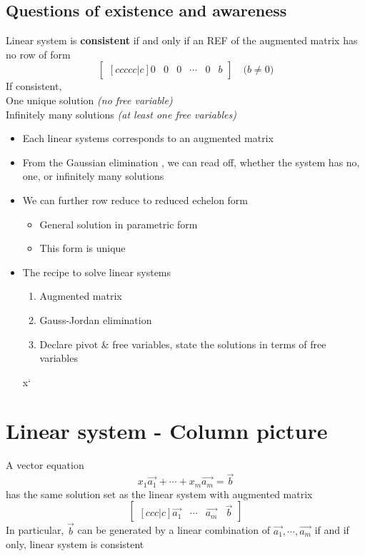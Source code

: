\documentclass{article}
\begin{document}
{\subsection{Questions of existence and awareness}

{
Linear system is \textbf{consistent} if and only if an REF of the augmented matrix has no row of form
\[
\begin{bmatrix}[ccccc|c]
    0 & 0 & 0 & \cdots & 0 & b 
\end{bmatrix}
 \quad \textit{($b \neq 0$)}
\]
If consistent, \\ One unique solution \textit{(no free variable)} \\  Infinitely many solutions \textit{(at least one free variables)}

\begin{itemize}
    \item{Each linear systems corresponds to an augmented matrix}
    \item{From the Gaussian elimination , we can read off, whether the system has no, one, or infinitely many solutions}
    \item{We can further row reduce to reduced echelon form}
    \begin{itemize}
        \item{General solution in parametric form}
        \item{This form is unique}
    \end{itemize}
    \item{The recipe to solve linear systems}
    \begin{enumerate}
        \item {Augmented matrix}
        \item {Gauss-Jordan elimination}
        \item {Declare pivot \& free variables, state the solutions in terms of free variables}
    \end{enumerate}x`
\end{itemize}
}

\section{Linear system - Column picture }

A vector equation
\[
x_1\vec{a_1} + \cdots + x_m\vec{a_m} = \vec{b}
\]
has the same solution set as the linear system with augmented matrix
\[
\begin{bmatrix}[ccc|c]
    \vec{a_1} & \cdots & \vec{a_m} & \vec{b}
\end{bmatrix}
\]
In particular, $\vec{b}$ can be generated by a linear combination of $\vec{a_1}, \cdots , \vec{a_m}$ if and if only, linear system is consistent
}
\end{document}
